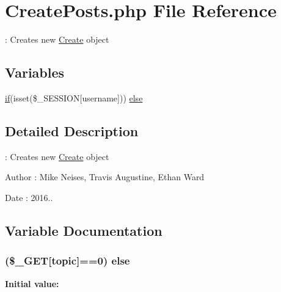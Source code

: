 \hypertarget{_create_posts_8php}{}\section{Create\+Posts.\+php File Reference}
\label{_create_posts_8php}


\+: Creates new \hyperlink{class_create}{Create} object  


\subsection*{Variables}
\begin{DoxyCompactItemize}
\item 
\hyperlink{_display_links_8php_aba19ca87a8222f9588fd377feafe258e}{if}(isset(\$\+\_\+\+S\+E\+S\+S\+I\+ON\mbox{[}\textquotesingle{}username\textquotesingle{}\mbox{]})) \hyperlink{_create_posts_8php_a4ee578ca622eb51d592be4dac358462e}{else}
\end{DoxyCompactItemize}


\subsection{Detailed Description}
\+: Creates new \hyperlink{class_create}{Create} object 

\begin{DoxyAuthor}{Author}
\+: Mike Neises, Travis Augustine, Ethan Ward 
\end{DoxyAuthor}
\begin{DoxyDate}{Date}
\+: 2016.. 
\end{DoxyDate}


\subsection{Variable Documentation}
\subsubsection[{\texorpdfstring{else}{else}}]{ (\$\+\_\+\+G\+ET\mbox{[}\textquotesingle{}topic\textquotesingle{}\mbox{]}==0) else}\hypertarget{_create_posts_8php_a4ee578ca622eb51d592be4dac358462e}{}\label{_create_posts_8php_a4ee578ca622eb51d592be4dac358462e}
{\bfseries Initial value\+:}
